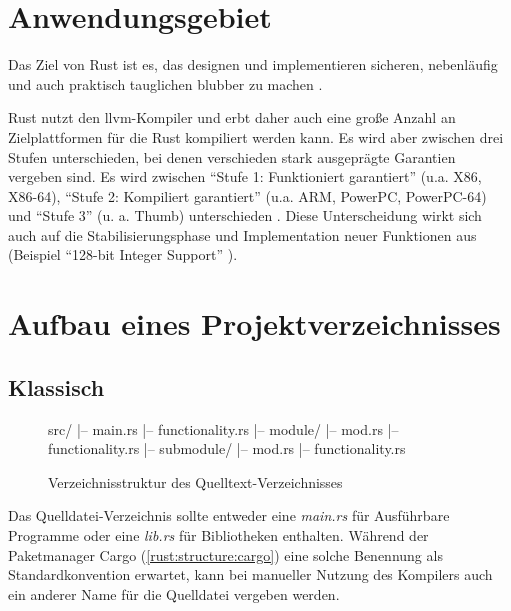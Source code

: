 
\section{Anwendungsgebiet}

Das Ziel von Rust ist es, das designen und implementieren sicheren, nebenläufig und auch praktisch tauglichen blubber zu machen \cite{rust:faq}.

Rust nutzt den \gls{llvm}-Kompiler und erbt daher auch eine große Anzahl an Zielplattformen für die Rust kompiliert werden kann.
Es wird aber zwischen drei Stufen unterschieden, bei denen verschieden stark ausgeprägte Garantien vergeben sind.
Es wird zwischen \enquote{Stufe 1: Funktioniert garantiert} (u.a. X86, X86-64), \enquote{Stufe 2: Kompiliert garantiert} (u.a. ARM, PowerPC, PowerPC-64) und \enquote{Stufe 3} (u. a. Thumb) unterschieden \cite{rust:platform_support}.
Diese Unterscheidung wirkt sich auch auf die Stabilisierungsphase und Implementation neuer Funktionen aus (Beispiel \enquote{128-bit Integer Support} \cite{rust:github:128bit_integer}).

\section{Aufbau eines Projektverzeichnisses}

\subsection{Klassisch}
\label{rust:structure:classic}
\begin{wrapfigure}{l}[-1em]{.4\textwidth}
	\begin{rustc}
		src/
		|-- main.rs
		|-- functionality.rs
		|-- module/
		    |-- mod.rs
		    |-- functionality.rs
		    |-- submodule/
		        |-- mod.rs
		        |-- functionality.rs
	\end{rustc}
	\caption{Verzeichnisstruktur des Quelltext-Verzeichnisses}
	\label{fig:rust:structure:classic}
\end{wrapfigure}

Das Quelldatei-Verzeichnis sollte entweder eine \textit{main.rs} für Ausführbare Programme oder eine \textit{lib.rs} für Bibliotheken enthalten.
Während der Paketmanager Cargo (\autoref{rust:structure:cargo}) eine solche Benennung als Standardkonvention erwartet, kann bei manueller Nutzung des Kompilers auch ein anderer Name für die Quelldatei vergeben werden.

